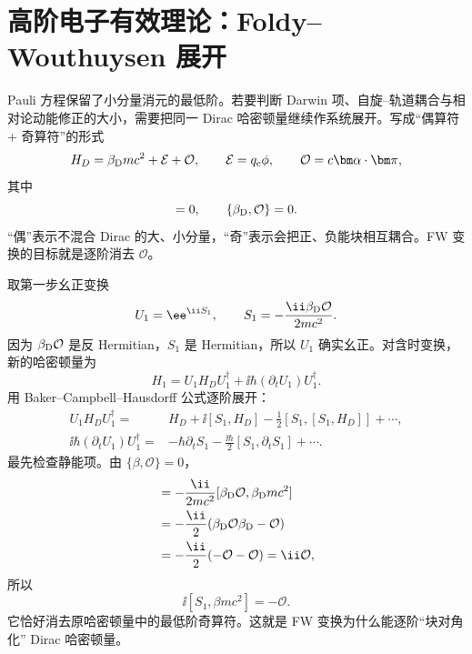 \section{高阶电子有效理论：Foldy--Wouthuysen 展开}

Pauli 方程保留了小分量消元的最低阶。若要判断 Darwin 项、自旋--轨道耦合与相对论动能修正的大小，需要把同一 Dirac 哈密顿量继续作系统展开。写成“偶算符 + 奇算符”的形式
\begin{equation}
H_D=\beta_{\rm D}mc^2+\mathcal E+\mathcal O,
\qquad
\mathcal E=q_{\rm e}\phi,
\qquad
\mathcal O=c\bm\alpha\cdot\bm\pi,
\label{eq:FW-even-odd}
\end{equation}
其中
\begin{equation}
[\beta_{\rm D},\mathcal E]=0,
\qquad
\{\beta_{\rm D},\mathcal O\}=0.
\end{equation}
“偶”表示不混合 Dirac 的大、小分量，“奇”表示会把正、负能块相互耦合。FW 变换的目标就是逐阶消去 $\mathcal O$。

取第一步幺正变换
\begin{equation}
U_1=\ee^{\ii S_1},
\qquad
S_1=-\frac{\ii\beta_{\rm D}\mathcal O}{2mc^2}.
\label{eq:FW-generator}
\end{equation}
因为 $\beta_{\rm D}\mathcal O$ 是反 Hermitian，$S_1$ 是 Hermitian，所以 $U_1$ 确实幺正。对含时变换，新的哈密顿量为
\begin{equation}
H_1=U_1H_DU_1^\dagger+
\ii\hbar(\partial_tU_1)U_1^\dagger.
\label{eq:FW-time-dependent-transform}
\end{equation}
用 Baker--Campbell--Hausdorff 公式逐阶展开：
\begin{align}
U_1H_DU_1^\dagger
={}&H_D+\ii[S_1,H_D]
-\frac12[S_1,[S_1,H_D]]+\cdots,\\
\ii\hbar(\partial_tU_1)U_1^\dagger
={}&-\hbar\partial_tS_1
-\frac{\ii\hbar}{2}[S_1,\partial_tS_1]+\cdots .
\end{align}
最先检查静能项。由 $\{\beta,\mathcal O\}=0$，
\begin{align}
[S_1,\beta_{\rm D} mc^2]
&=-\frac{\ii}{2mc^2}
[\beta_{\rm D}\mathcal O,\beta_{\rm D} mc^2]\\
&=-\frac{\ii}{2}
(\beta_{\rm D}\mathcal O\beta_{\rm D}-\mathcal O)\\
&=-\frac{\ii}{2}(-\mathcal O-\mathcal O)
=\ii\mathcal O,
\end{align}
所以
\begin{equation}
\ii[S_1,\beta mc^2]=-\mathcal O.
\end{equation}
它恰好消去原哈密顿量中的最低阶奇算符。这就是 FW 变换为什么能逐阶“块对角化” Dirac 哈密顿量。

